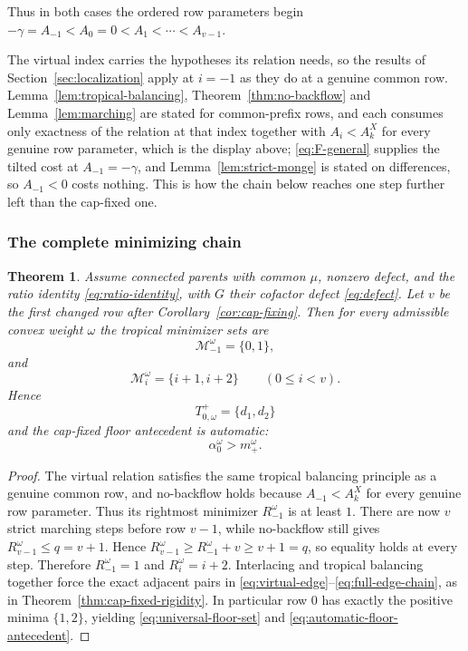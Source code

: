 \documentclass[11pt,a4paper]{amsart}
\numberwithin{equation}{section}
\theoremstyle{plain}
\newtheorem{theorem}{Theorem}[section]
\theoremstyle{definition}
\begin{document}
Thus in both cases the ordered row parameters begin \(-\gamma=A_{-1}<A_0=0<A_1<\cdots<A_{v-1}\).

The virtual index carries the hypotheses its relation needs, so the results of Section~\ref{sec:localization} apply at \(i=-1\) as they do at a genuine common row.  Lemma~\ref{lem:tropical-balancing}, Theorem~\ref{thm:no-backflow} and Lemma~\ref{lem:marching} are stated for common-prefix rows, and each consumes only exactness of the relation at that index together with \(A_i<A_k^X\) for every genuine row parameter, which is the display above; \eqref{eq:F-general} supplies the tilted cost at \(A_{-1}=-\gamma\), and Lemma~\ref{lem:strict-monge} is stated on differences, so \(A_{-1}<0\) costs nothing.  This is how the chain below reaches one step further left than the cap-fixed one.

\subsubsection{The complete minimizing chain}

\begin{theorem}\label{thm:ratio-rigidity}
Assume connected parents with common \(\mu\), nonzero defect, and the ratio identity \eqref{eq:ratio-identity}, with \(G\) their cofactor defect \eqref{eq:defect}.  Let \(v\) be the first changed row after Corollary~\ref{cor:cap-fixing}.  Then for every admissible convex weight \(\omega\) the tropical minimizer sets are
\begin{equation}\label{eq:virtual-edge}
\mathcal M_{-1}^\omega=\{0,1\},
\end{equation}
and
\begin{equation}\label{eq:full-edge-chain}
\mathcal M_i^\omega=\{i+1,i+2\}
\qquad(0\le i<v).
\end{equation}
Hence
\begin{equation}\label{eq:universal-floor-set}
T_{0,\omega}^+=\{d_1,d_2\}
\end{equation}
and the cap-fixed floor antecedent is automatic:
\begin{equation}\label{eq:automatic-floor-antecedent}
\alpha_0^\omega>m_+^\omega.
\end{equation}
\end{theorem}

\begin{proof}
The virtual relation satisfies the same tropical balancing principle as a genuine common row, and no-backflow holds because \(A_{-1}<A_k^X\) for every genuine row parameter.  Thus its rightmost minimizer \(R_{-1}^\omega\) is at least \(1\).  There are now \(v\) strict marching steps before row \(v-1\), while no-backflow still gives \(R_{v-1}^\omega\le q=v+1\).  Hence \(R_{v-1}^\omega\ge R_{-1}^\omega+v\ge v+1=q\),
so equality holds at every step.  Therefore \(R_{-1}^\omega=1\) and \(R_i^\omega=i+2\).  Interlacing and tropical balancing together force the exact adjacent pairs in \eqref{eq:virtual-edge}--\eqref{eq:full-edge-chain}, as in Theorem~\ref{thm:cap-fixed-rigidity}.  In particular row \(0\) has exactly the positive minima \(\{1,2\}\), yielding \eqref{eq:universal-floor-set} and \eqref{eq:automatic-floor-antecedent}.
\end{proof}
\end{document}
